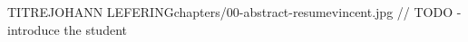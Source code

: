 
 
\begin{thesis}{TITRE}{JOHANN LEFERING}{chapters/00-abstract-resume}{vincent.jpg}{ // TODO - introduce the student}   
    
    
    
    
    
\end{thesis}



